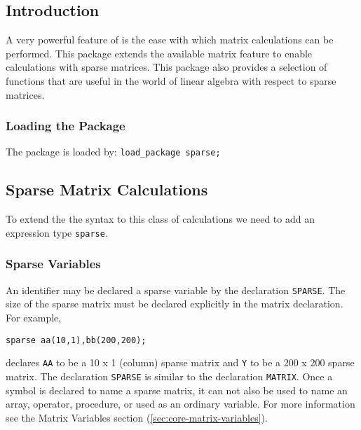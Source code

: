 

\newcommand\sparselineqlist {lin\_eqn$_{1}$,lin\_eqn$_{2}$, \ldots ,lin\_eqn$_{n}$}
\newcommand\sparsematlist   {mat$_{1}$,mat$_{2}$, \ldots ,mat$_{n}$}
\newcommand\sparseveclist   {vec$_{1}$,vec$_{2}$, \ldots ,vec$_{n}$}

\newcommand\sparselazyfootnote{\footnote{The \{\}'s can be omitted.}}


\subsection{Introduction}
A very powerful feature of \REDUCE{} is the ease with which matrix
calculations can be performed.
This package extends the available matrix feature to enable calculations
with sparse matrices. This package also provides a selection of
functions that are useful in the world of linear algebra with respect to
sparse matrices.

\subsubsection*{Loading the Package}
The package is loaded by: \texttt{load\_package sparse;}

\subsection{Sparse Matrix Calculations}
To extend the the syntax to this class of calculations we need to add an
expression type \texttt{sparse}.

\subsubsection{Sparse Variables}
An identifier may be declared a sparse variable by the declaration
\texttt{SPARSE}.
The size of the sparse matrix must be declared explicitly in the matrix
declaration. For example,
\begin{verbatim}
sparse aa(10,1),bb(200,200);
\end{verbatim}
declares \texttt{AA} to be a 10 x 1 (column) sparse matrix and \texttt{Y} to
be a 200 x 200 sparse matrix.
The declaration \texttt{SPARSE} is similar to the declaration \texttt{MATRIX}.
Once a symbol is declared to name a sparse matrix, it can not also be
used to name an array, operator, procedure, or used as an ordinary
variable. For more information see the Matrix Variables
section (\ref{sec:core-matrix-variables}).

